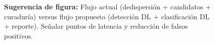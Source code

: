 \begin{figure}[h]
\centering
\caption{\textbf{Sugerencia de figura:} Flujo actual (dedispersión + candidatos + curaduría) versus flujo propuesto (detección DL + clasificación DL + reporte). Señalar puntos de latencia y reducción de falsos positivos.}
\end{figure}

\newpage